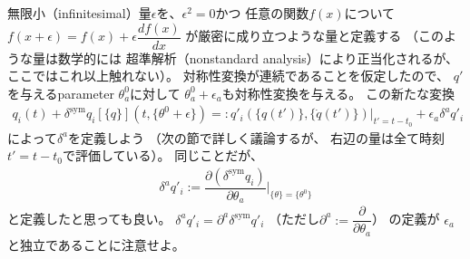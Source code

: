 無限小（infinitesimal）量$\epsilon$を、$\epsilon^2 = 0$かつ
任意の関数$f(x)$について
$f(x+\epsilon)=f(x) + \epsilon \dfrac{df(x)}{dx}$
が厳密に成り立つような量と定義する
（このような量は数学的には
超準解析（nonstandard analysis）により正当化されるが、
ここではこれ以上触れない）。
対称性変換が連続であることを仮定したので、
$q'$を与えるparameter $\theta_a^0$に対して
$\theta_a^0 + \epsilon_a$も対称性変換を与える。
この新たな変換
\begin{align}
  q_i(t) +
  \delta^{\mathrm{sym}} q_i[\{ q \}] (t, \{\theta^0 + \epsilon\})
  =:
  q'_i( \{ q(t') \}, \{ \dot{q}(t') \} )
    \Big|_{t' = t - t_0}
  + \epsilon_a \delta^a q'_i
\end{align}
によって$\delta^a$を定義しよう
（次の節で詳しく議論するが、
右辺の量は全て時刻$t' = t - t_0$で評価している）。
同じことだが、
\begin{align}
  \delta^a q'_i :=
  \dfrac{\partial
    (\delta^{\mathrm{sym}} q_i)
  }{
    \partial \theta_a
  }
  \Bigg|_{\{\theta\} = \{\theta^0\}}
\end{align}
と定義したと思っても良い。
$\delta^a q'_i
= \partial^a \delta^{\mathrm{sym}} q'_i$
（ただし$\partial^a := \dfrac{\partial}{\partial \theta_a}$）
の定義が
$\epsilon_a$と独立であることに注意せよ。

